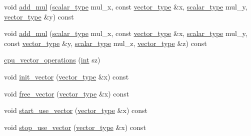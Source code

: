\begin{DoxyCompactItemize}
\item 
void \hyperlink{structcpu__vector__operations_a19a2b91881a13f4b4372164aecc3fb67}{add\-\_\-mul} (\hyperlink{structcpu__vector__operations_aca6b216aa1fb172df83d98350e94fd61}{scalar\-\_\-type} mul\-\_\-x, const \hyperlink{structcpu__vector__operations_a1962836df596ce262704d208e9a6d8f9}{vector\-\_\-type} \&x, \hyperlink{structcpu__vector__operations_aca6b216aa1fb172df83d98350e94fd61}{scalar\-\_\-type} mul\-\_\-y, \hyperlink{structcpu__vector__operations_a1962836df596ce262704d208e9a6d8f9}{vector\-\_\-type} \&y) const 
\item 
void \hyperlink{structcpu__vector__operations_a6fa2370a0e2623c5ecc75e149cfda4d7}{add\-\_\-mul} (\hyperlink{structcpu__vector__operations_aca6b216aa1fb172df83d98350e94fd61}{scalar\-\_\-type} mul\-\_\-x, const \hyperlink{structcpu__vector__operations_a1962836df596ce262704d208e9a6d8f9}{vector\-\_\-type} \&x, \hyperlink{structcpu__vector__operations_aca6b216aa1fb172df83d98350e94fd61}{scalar\-\_\-type} mul\-\_\-y, const \hyperlink{structcpu__vector__operations_a1962836df596ce262704d208e9a6d8f9}{vector\-\_\-type} \&y, \hyperlink{structcpu__vector__operations_aca6b216aa1fb172df83d98350e94fd61}{scalar\-\_\-type} mul\-\_\-z, \hyperlink{structcpu__vector__operations_a1962836df596ce262704d208e9a6d8f9}{vector\-\_\-type} \&z) const 
\item 
\hyperlink{structcpu__vector__operations_ac5f2995a40bfdf6cc126adfbb5e81f93}{cpu\-\_\-vector\-\_\-operations} (\hyperlink{classint}{int} sz)
\item 
void \hyperlink{structcpu__vector__operations_a8e3da0067d3368df889f4559ca5df94c}{init\-\_\-vector} (\hyperlink{structcpu__vector__operations_a1962836df596ce262704d208e9a6d8f9}{vector\-\_\-type} \&x) const 
\item 
void \hyperlink{structcpu__vector__operations_ab611343789ba4dab20b9d162b4963789}{free\-\_\-vector} (\hyperlink{structcpu__vector__operations_a1962836df596ce262704d208e9a6d8f9}{vector\-\_\-type} \&x) const 
\item 
void \hyperlink{structcpu__vector__operations_a36ce15d54cfb2b08aeeb25d7e601e342}{start\-\_\-use\-\_\-vector} (\hyperlink{structcpu__vector__operations_a1962836df596ce262704d208e9a6d8f9}{vector\-\_\-type} \&x) const 
\item 
void \hyperlink{structcpu__vector__operations_ab79fb826fdea7cc2a301e9db9bdc705e}{stop\-\_\-use\-\_\-vector} (\hyperlink{structcpu__vector__operations_a1962836df596ce262704d208e9a6d8f9}{vector\-\_\-type} \&x) const 
\item 

\end{DoxyCompactItemize}
